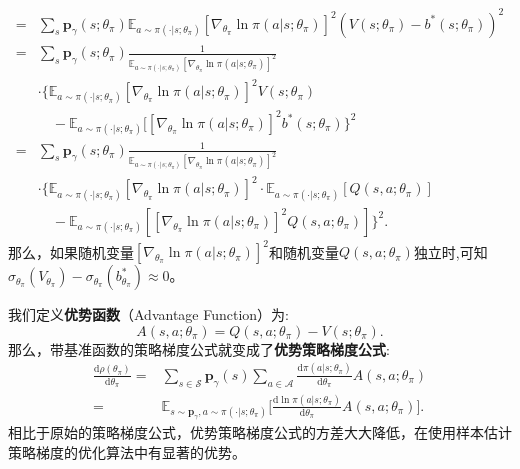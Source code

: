 \begin{align*}
    =& \sum_{s} \mathbf{p}_{\gamma}(s; \theta_\pi) \mathbb{E}_{a\sim\pi(\cdot \vert s; \theta_\pi)}
    [\nabla_{\theta_\pi} \ln \pi(a \vert s; \theta_\pi)]^2 
        (V(s; \theta_\pi) - b^*(s;\theta_\pi))^2\\
    =& \sum_{s} \mathbf{p}_{\gamma}(s; \theta_\pi) 
    \frac{1}
    {\mathbb{E}_{a\sim\pi(\cdot \vert s; \theta_\pi)}
    [\nabla_{\theta_\pi} \ln \pi(a \vert s; \theta_\pi)]^2} \\
    &\cdot\{\mathbb{E}_{a\sim\pi(\cdot \vert s; \theta_\pi)}[\nabla_{\theta_\pi} 
    \ln \pi(a \vert s; \theta_\pi)]^2 V(s;\theta_\pi)\\
    & \quad - \mathbb{E}_{a\sim\pi(\cdot \vert s; \theta_\pi)}
    [[\nabla_{\theta_\pi} \ln \pi(a \vert s; \theta_\pi)]^2 b^*(s;\theta_\pi) \}^2\\
    =& \sum_{s} \mathbf{p}_{\gamma}(s; \theta_\pi) 
    \frac{1}
    {\mathbb{E}_{a\sim\pi(\cdot \vert s; \theta_\pi)}
    [\nabla_{\theta_\pi} \ln \pi(a \vert s; \theta_\pi)]^2} \\
    &\cdot\{\mathbb{E}_{a\sim\pi(\cdot \vert s; \theta_\pi)}[\nabla_{\theta_\pi} 
    \ln \pi(a \vert s; \theta_\pi)]^2 \cdot 
    \mathbb{E}_{a\sim\pi(\cdot \vert s; \theta_\pi)} 
    [Q(s, a; \theta_\pi)] \\
    & \quad - \mathbb{E}_{a\sim\pi(\cdot \vert s; \theta_\pi)}
    [[\nabla_{\theta_\pi} \ln \pi(a \vert s; \theta_\pi)]^2 Q(s, a; \theta_\pi)] \}^2.
\end{align*}
那么，如果随机变量$[\nabla_{\theta_\pi} \ln \pi(a \vert s; \theta_\pi)]^2$和随机变量$Q(s, a; \theta_\pi)$独立时,可知$\sigma_{\theta_\pi}(V_{\theta_\pi}) - \sigma_{\theta_\pi}(b^*_{\theta_\pi}) \approx 0$。

我们定义\textbf{优势函数}（Advantage Function）为:
\begin{equation}
    A(s, a; \theta_\pi) = Q(s, a; \theta_\pi) - V(s; \theta_\pi).
\end{equation}
那么，带基准函数的策略梯度公式就变成了\textbf{优势策略梯度公式}:
\begin{equation}
    \begin{aligned}
    \frac{\mathrm{d} \rho(\theta_\pi)}{\mathrm{d} \theta_\pi}
    =& \sum_{s \in \mathcal{S}} \mathbf{p}_{\gamma}(s)
    \sum_{a \in \mathcal{A}} \frac{\mathrm{d}\pi(a \vert s; \theta_\pi)}
    {\mathrm{d} \theta_\pi} A(s, a; \theta_\pi) \\
    =& \mathbb{E}_{s \sim \mathbf{p}_\gamma, a \sim \pi(\cdot \vert s; \theta_\pi)}
    \bigg[\frac{\mathrm{d} \ln \pi(a \vert s; \theta_\pi)}
    {\mathrm{d} \theta_\pi} A(s, a; \theta_\pi)\bigg].
    \end{aligned}
\end{equation}
相比于原始的策略梯度公式，优势策略梯度公式的方差大大降低，在使用样本估计策略梯度的优化算法中有显著的优势。

